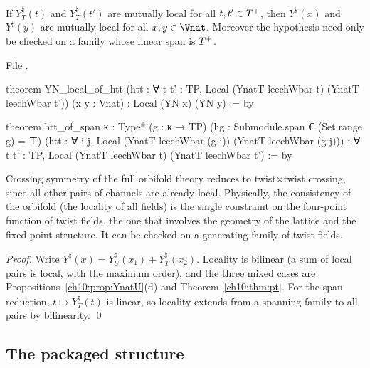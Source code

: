 \begin{theorem}\label{ch10:thm:localhtt}
If $Y^\natural_T(t)$ and $Y^\natural_T(t')$ are mutually local for all $t,t'\in T^{+}$, then
$Y^\natural(x)$ and $Y^\natural(y)$ are mutually local for all $x,y\in\Vnat$.  Moreover the hypothesis
need only be checked on a family whose linear span is $T^{+}$.
\end{theorem}
\noindent File .
\begin{leancode}
theorem YN_local_of_htt (htt : ∀ t t' : TP, Local (YnatT leechWbar t) (YnatT leechWbar t'))
    (x y : Vnat) : Local (YN x) (YN y) := by

theorem htt_of_span {κ : Type*} (g : κ → TP) (hg : Submodule.span ℂ (Set.range g) = ⊤)
    (htt : ∀ i j, Local (YnatT leechWbar (g i)) (YnatT leechWbar (g j))) :
    ∀ t t' : TP, Local (YnatT leechWbar t) (YnatT leechWbar t') := by
\end{leancode}

\begin{physics}
Crossing symmetry of the full orbifold theory reduces to twist$\times$twist crossing, since all other pairs of channels are already local. Physically, the consistency of the orbifold (the locality of all fields) is the single constraint on the four-point function of twist fields, the one that involves the geometry of the lattice and the fixed-point structure. It can be checked on a generating family of twist fields.
\end{physics}

\emph{Proof.} Write $Y^\natural(x)=Y^\natural_U(x_1)+Y^\natural_T(x_2)$.  Locality is bilinear (a sum of
local pairs is local, with the maximum order), and the three mixed cases are
Propositions~\ref{ch10:prop:YnatU}(d) and Theorem~\ref{ch10:thm:pt}.  For the span reduction,
$t\mapsto Y^\natural_T(t)$ is linear, so locality extends from a spanning family to all pairs by
bilinearity. \qed

\subsection{The packaged structure}

